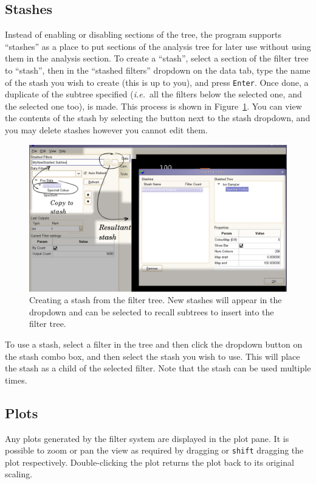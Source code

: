 \documentclass[10pt]{article}
\begin{document}
\subsection{Stashes}

Instead of enabling or disabling sections of the tree, the program supports ``stashes'' as a place to put sections of the analysis tree for later use without using them in the analysis section. To create a ``stash'', select a section of the filter tree to ``stash'', then in the ``stashed filters'' dropdown on the data tab, type the name of the stash you wish to create (this is up to you), and press \texttt{Enter}. Once done, a duplicate of the subtree specified (\emph{i.e.}\ all the filters below the selected one, and the selected one too), is made. This process is shown in Figure~\ref{fig:stash-creation}. You can view the contents of the stash by selecting the button next to the stash dropdown, and you may delete stashes however you cannot edit them.  


\begin{figure}[ht]
  \centering
 \includegraphics[width=0.85 \textwidth,keepaspectratio=true]{./figures/Stash-operation.png}
 \caption{Creating a stash from the filter tree. New stashes will appear in the dropdown and can be selected to recall subtrees to insert into the filter tree.}
\label{fig:stash-creation}

\end{figure}

To use a stash, select a filter in the tree and then click the dropdown button on the stash combo box, and then select the stash you wish to use. This will place the stash as a child of the selected filter. Note that the stash can be used multiple times.  

\subsection{Plots}
Any plots generated by the filter system are displayed in the plot pane. It is possible to zoom or pan the view as required by dragging or \texttt{shift} dragging the plot respectively. Double-clicking the plot returns the plot back to its original scaling.
\end{document}
